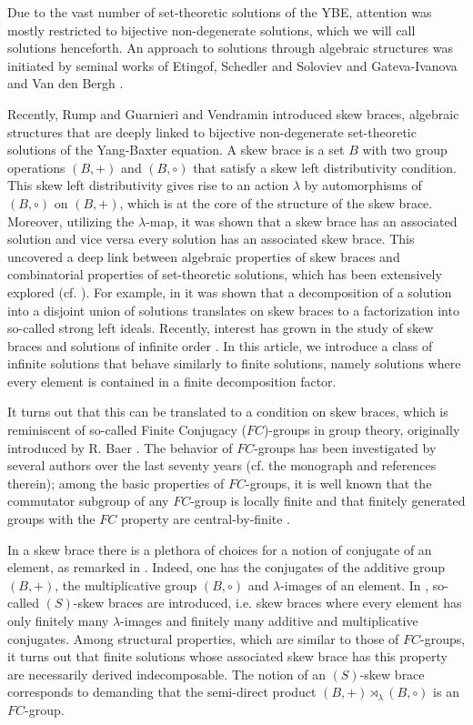 \documentclass{amsart}
\begin{document}
Due to the vast number of set-theoretic solutions of the YBE, attention was mostly restricted to bijective non-degenerate solutions, which we will call solutions henceforth. An approach to solutions through algebraic structures was initiated by seminal works of Etingof, Schedler and Soloviev \cite{MR1722951} and Gateva-Ivanova and Van den Bergh \cite{MR1637256}.

Recently, Rump \cite{MR2278047} and Guarnieri and Vendramin \cite{MR3647970} introduced skew braces, algebraic structures that are deeply linked to bijective non-degenerate set-theoretic solutions of the Yang-Baxter equation. A skew brace is a set $B$ with two group operations $(B,+)$ and $(B,\circ)$ that satisfy a skew left distributivity condition. This skew left distributivity gives rise to an action $\lambda$ by automorphisms of $(B,\circ)$ on $(B,+)$, which is at the core of the structure of the skew brace. 
Moreover, utilizing the $\lambda$-map, it was shown \cite{MR3647970, LYZset,MR2278047} that a skew brace has an associated solution and vice versa every solution has an associated skew brace. This uncovered a deep link between algebraic properties of skew braces and combinatorial properties of set-theoretic solutions, which has been extensively explored (cf. \cite{MR3815290,Cast22, MR4457900, MR3957824,s, MR4470170,MR4023387, cablingorig, MR4163866}). For example, in \cite{MR4023387} it was shown that a decomposition of a solution into a disjoint union of solutions translates on skew braces to a factorization into so-called strong left ideals. Recently, interest has grown in the study of skew braces and solutions of infinite order \cite{MR4718182, index, conju, dedekind}. In this article, we introduce a class of infinite solutions that behave similarly to finite solutions, namely solutions where every element is contained in a finite decomposition factor.

It turns out that this can be translated to a condition on skew braces, which is reminiscent of so-called Finite Conjugacy ($FC$)-groups in group theory, originally introduced by R. Baer \cite{FC}. The behavior of $FC$-groups has been investigated by several authors over the last seventy years (cf. the monograph \cite{Tomkinson} and references therein); among the basic properties of $FC$-groups, it is well known that the commutator subgroup of any $FC$-group is locally finite \cite{neumann} and that finitely generated groups with the $FC$ property are central-by-finite \cite{FC}. 

In a skew brace there is a plethora of choices for a notion of conjugate of an element, as remarked in \cite{conju}. Indeed, one has the conjugates of the additive group $(B,+)$, the multiplicative group $(B,\circ)$ and $\lambda$-images of an element. In \cite{s}, so-called $(S)$-skew braces are introduced, i.e. skew braces where every element has only finitely many $\lambda$-images and finitely many additive and multiplicative conjugates. 
Among structural properties, which are similar to those of $FC$-groups, it turns out that finite solutions whose associated skew brace has this property are necessarily derived indecomposable. The notion of an $(S)$-skew brace corresponds to demanding that the semi-direct product $(B,+)\rtimes_{\lambda}(B,\circ)$ is an $FC$-group. 
\end{document}
